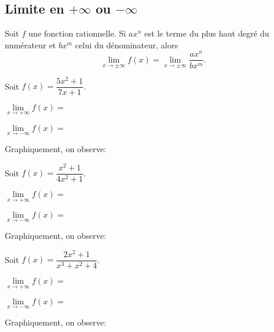 \documentclass[a4paper,12pt]{report}
\newcommand{\pinf}{+\infty}
\newcommand{\minf}{-\infty}
\newcommand{\pminf}{\pm\infty}
\begin{document}
\subsection{Limite en \(\pinf\) ou \(\minf\)}
\label{sec:orgbe59014}
\begin{propriete}
Soit \(f\) une fonction rationnelle. Si \(ax^n\) est le terme du plus haut degré du
numérateur et \(bx^m\) celui du dénominateur, alors
\[
\lim\limits_{x\to\pminf}f(x)=\lim\limits_{x\to\pminf}\dfrac{ax^n}{bx^m}.
\]
\end{propriete}
\begin{exemple}
Soit \(f(x)=\dfrac{5x^2+1}{7x+1}\).

\begin{minipage}{0.35\textwidth}

\end{minipage}
\hspace{0.05\linewidth}
\begin{minipage}[][][t]{0.5\textwidth}
\(\lim\limits_{x\to\pinf}f(x)=\)
\vspace{1cm}

\(\lim\limits_{x\to\minf}f(x)=\)
\vspace{1cm}

Graphiquement, on observe:
\vspace{1cm}
\end{minipage}
\end{exemple}

\begin{exemple}
Soit \(f(x)=\dfrac{x^2+1}{4x^2+1}\).

\begin{minipage}{0.35\textwidth}

\end{minipage}
\hspace{0.05\linewidth}
\begin{minipage}[][][t]{0.5\textwidth}
\(\lim\limits_{x\to\pinf}f(x)=\)
\vspace{1cm}

\(\lim\limits_{x\to\minf}f(x)=\)
\vspace{1cm}

Graphiquement, on observe:
\vspace{1cm}
\end{minipage}
\end{exemple}


\begin{exemple}
Soit \(f(x)=\dfrac{2x^2+1}{x^3+x^2+4}\).

\begin{minipage}{0.35\textwidth}

\end{minipage}
\hspace{0.05\linewidth}
\begin{minipage}[][][t]{0.5\textwidth}
\(\lim\limits_{x\to\pinf}f(x)=\)
\vspace{1cm}

\(\lim\limits_{x\to\minf}f(x)=\)
\vspace{1cm}

Graphiquement, on observe:
\vspace{1cm}
\end{minipage}
\end{exemple}
\end{document}
